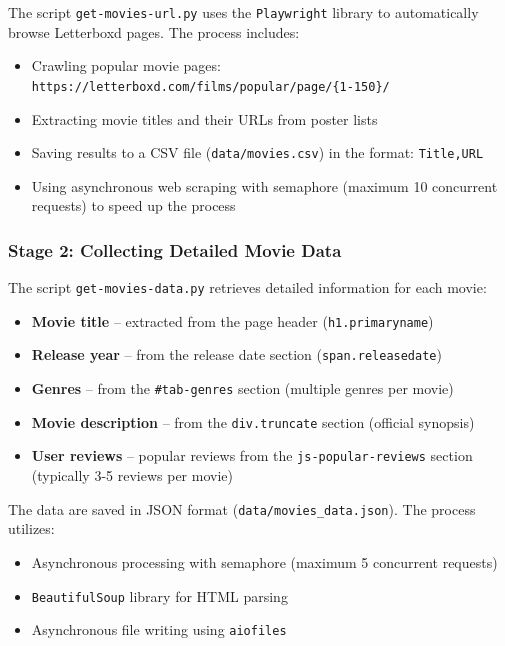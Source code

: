 \documentclass[12pt,a4paper]{article}
\begin{document}
The script \texttt{get-movies-url.py} uses the \texttt{Playwright} library to automatically browse Letterboxd pages. The process includes:

\begin{itemize}
    \item Crawling popular movie pages: \texttt{https://letterboxd.com/films/popular/page/\{1-150\}/}
    \item Extracting movie titles and their URLs from poster lists
    \item Saving results to a CSV file (\texttt{data/movies.csv}) in the format: \texttt{Title,URL}
    \item Using asynchronous web scraping with semaphore (maximum 10 concurrent requests) to speed up the process
\end{itemize}

\subsubsection{Stage 2: Collecting Detailed Movie Data}

The script \texttt{get-movies-data.py} retrieves detailed information for each movie:

\begin{itemize}
    \item \textbf{Movie title} -- extracted from the page header (\texttt{h1.primaryname})
    \item \textbf{Release year} -- from the release date section (\texttt{span.releasedate})
    \item \textbf{Genres} -- from the \texttt{\#tab-genres} section (multiple genres per movie)
    \item \textbf{Movie description} -- from the \texttt{div.truncate} section (official synopsis)
    \item \textbf{User reviews} -- popular reviews from the \texttt{js-popular-reviews} section (typically 3-5 reviews per movie)
\end{itemize}

The data are saved in JSON format (\texttt{data/movies_data.json}). The process utilizes:
\begin{itemize}
    \item Asynchronous processing with semaphore (maximum 5 concurrent requests)
    \item \texttt{BeautifulSoup} library for HTML parsing
    \item Asynchronous file writing using \texttt{aiofiles}
\end{itemize}
\end{document}
